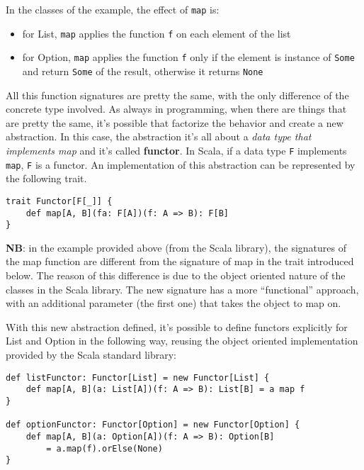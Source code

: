 In the classes of the example, the effect of \texttt{map} is:

\begin{itemize}
\itemsep1pt\parskip0pt
\item
  for List, \texttt{map} applies the function \texttt{f} on each element
  of the list
\item
  for Option, \texttt{map} applies the function \texttt{f} only if the
  element is instance of \texttt{Some} and return \texttt{Some} of the
  result, otherwise it returns \texttt{None}
\end{itemize}

All this function signatures are pretty the same, with the only
difference of the concrete type involved. As always in programming, when
there are things that are pretty the same, it's possible that factorize
the behavior and create a new abstraction. In this case, the abstraction
it's all about a \emph{data type that implements map} and it's called
\textbf{functor}. In Scala, if a data type \texttt{F} implements
\texttt{map}, \texttt{F} is a functor. An implementation of this
abstraction can be represented by the following trait.

\begin{verbatim}
trait Functor[F[_]] {
    def map[A, B](fa: F[A])(f: A => B): F[B]
}
\end{verbatim}

\textbf{NB}: in the example provided above (from the Scala library), the
signatures of the map function are different from the signature of map
in the trait introduced below. The reason of this difference is due to
the object oriented nature of the classes in the Scala library. The new
signature has a more ``functional'' approach, with an additional
parameter (the first one) that takes the object to map on.

With this new abstraction defined, it's possible to define functors
explicitly for List and Option in the following way, reusing the object
oriented implementation provided by the Scala standard library:

\begin{verbatim}
def listFunctor: Functor[List] = new Functor[List] {
    def map[A, B](a: List[A])(f: A => B): List[B] = a map f
}

def optionFunctor: Functor[Option] = new Functor[Option] {
    def map[A, B](a: Option[A])(f: A => B): Option[B] 
    	= a.map(f).orElse(None)
}
\end{verbatim}

